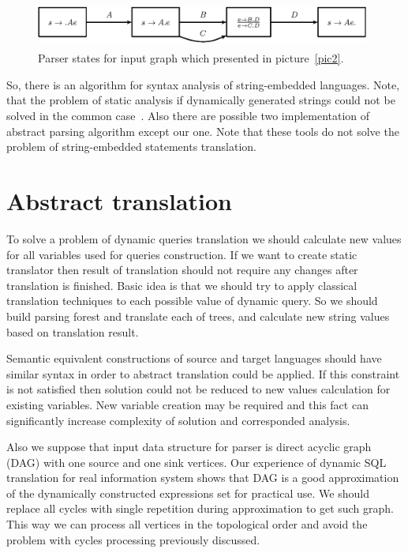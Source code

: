 \documentclass{llncs}
\begin{document}
\begin{figure}
    \begin{center}
        \includegraphics[width=11cm,height=1.5cm]{graphs/simple_grammar_items.eps}
        \caption{Parser states for input graph which presented in picture~\ref{pic2}.}
        \label{pic3}
    \end{center}
\end{figure}

So, there is an algorithm for syntax analysis of string-embedded languages. Note, that the problem of static 
analysis if dynamically generated strings could not be solved in the common case~\cite{ALVOR2}. Also there are 
possible two implementation of abstract parsing algorithm except our one. Note that these tools do not solve 
the problem of string-embedded statements translation.


\section{Abstract translation}
\label{sec:AbstractTranslation}

To solve a problem of dynamic queries translation we should calculate new values for all variables used for queries construction. If we want to create static translator then result of translation should not require any changes after translation is finished. Basic idea is that we should try to apply classical translation techniques to each possible value of dynamic query. So we should build parsing forest and translate each of trees, and calculate new string values based on translation result.

Semantic equivalent constructions of source and target languages should have similar syntax in order to abstract translation could be applied. If this constraint is not satisfied then solution could not be reduced to new values calculation for existing variables. New variable creation may be required and this fact can significantly increase complexity of solution and corresponded analysis.

Also we suppose that input data structure for parser is direct acyclic graph (DAG) with one source and one sink vertices. Our experience of dynamic SQL translation for real information system shows that DAG is a good approximation of the dynamically constructed expressions set for practical use. We should replace all cycles with single repetition during approximation to get such graph. This way we can process all vertices in the topological order and avoid the problem with cycles processing previously discussed.
\end{document}
